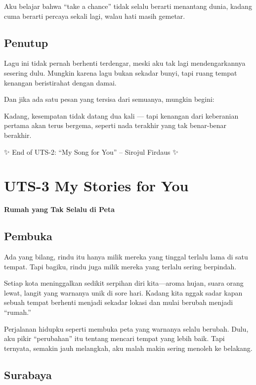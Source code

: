 \documentclass[
  letterpaper,
  DIV=11,
  numbers=noendperiod]{scrreprt}
\begin{document}
Aku belajar bahwa ``take a chance'' tidak selalu berarti menantang
dunia, kadang cuma berarti percaya sekali lagi, walau hati masih
gemetar.

\section{Penutup}\label{penutup}

Lagu ini tidak pernah berhenti terdengar, meski aku tak lagi
mendengarkannya sesering dulu. Mungkin karena lagu bukan sekadar bunyi,
tapi ruang tempat kenangan beristirahat dengan damai.

Dan jika ada satu pesan yang tersisa dari semuanya, mungkin begini:

Kadang, kesempatan tidak datang dua kali --- tapi kenangan dari
keberanian pertama akan terus bergema, seperti nada terakhir yang tak
benar-benar berakhir.

✨ End of UTS-2: ``My Song for You'' -- Sirojul Firdaus ✨

\chapter{UTS-3 My Stories for You}\label{uts-3-my-stories-for-you}

\textbf{Rumah yang Tak Selalu di Peta}

\section{Pembuka}\label{pembuka}

Ada yang bilang, rindu itu hanya milik mereka yang tinggal terlalu lama
di satu tempat. Tapi bagiku, rindu juga milik mereka yang terlalu sering
berpindah.

Setiap kota meninggalkan sedikit serpihan diri kita---aroma hujan, suara
orang lewat, langit yang warnanya unik di sore hari. Kadang kita nggak
sadar kapan sebuah tempat berhenti menjadi sekadar lokasi dan mulai
berubah menjadi ``rumah.''

Perjalanan hidupku seperti membuka peta yang warnanya selalu berubah.
Dulu, aku pikir ``perubahan'' itu tentang mencari tempat yang lebih
baik. Tapi ternyata, semakin jauh melangkah, aku malah makin sering
menoleh ke belakang.

\section{Surabaya}\label{surabaya}
\end{document}
